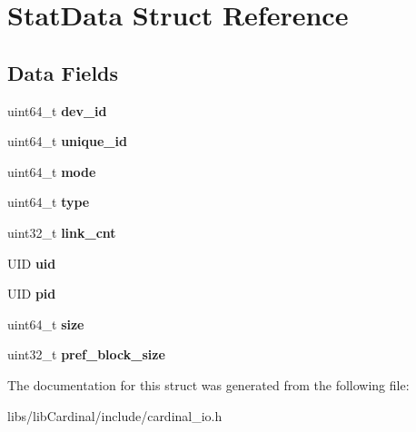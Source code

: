 \hypertarget{structStatData}{}\section{Stat\+Data Struct Reference}
\label{structStatData}
\subsection*{Data Fields}
\begin{DoxyCompactItemize}
\item 
uint64\+\_\+t {\bfseries dev\+\_\+id}\hypertarget{structStatData_a162b09d03cbfb59b4facff7db552c781}{}\label{structStatData_a162b09d03cbfb59b4facff7db552c781}

\item 
uint64\+\_\+t {\bfseries unique\+\_\+id}\hypertarget{structStatData_aa928aad0aee93ed546c4028918b51ad9}{}\label{structStatData_aa928aad0aee93ed546c4028918b51ad9}

\item 
uint64\+\_\+t {\bfseries mode}\hypertarget{structStatData_afe1f0a0f9c94e5f9dfa9724263963d82}{}\label{structStatData_afe1f0a0f9c94e5f9dfa9724263963d82}

\item 
uint64\+\_\+t {\bfseries type}\hypertarget{structStatData_a644a020c7aa263a14ab8ebc75361805e}{}\label{structStatData_a644a020c7aa263a14ab8ebc75361805e}

\item 
uint32\+\_\+t {\bfseries link\+\_\+cnt}\hypertarget{structStatData_a064c2ec1a0518f6a57e5cf6efd5c60c0}{}\label{structStatData_a064c2ec1a0518f6a57e5cf6efd5c60c0}

\item 
U\+ID {\bfseries uid}\hypertarget{structStatData_a9798331efe35ecd29e071333ec82554e}{}\label{structStatData_a9798331efe35ecd29e071333ec82554e}

\item 
U\+ID {\bfseries pid}\hypertarget{structStatData_adc5017c517252c8a51a4e1bfa1af0aed}{}\label{structStatData_adc5017c517252c8a51a4e1bfa1af0aed}

\item 
uint64\+\_\+t {\bfseries size}\hypertarget{structStatData_afba935eae7abb1c3f72ee0708f8a7553}{}\label{structStatData_afba935eae7abb1c3f72ee0708f8a7553}

\item 
uint32\+\_\+t {\bfseries pref\+\_\+block\+\_\+size}\hypertarget{structStatData_ac61f408bbcbd65191677cac1badb37fa}{}\label{structStatData_ac61f408bbcbd65191677cac1badb37fa}

\end{DoxyCompactItemize}


The documentation for this struct was generated from the following file\+:\begin{DoxyCompactItemize}
\item 
libs/lib\+Cardinal/include/cardinal\+\_\+io.\+h\end{DoxyCompactItemize}
